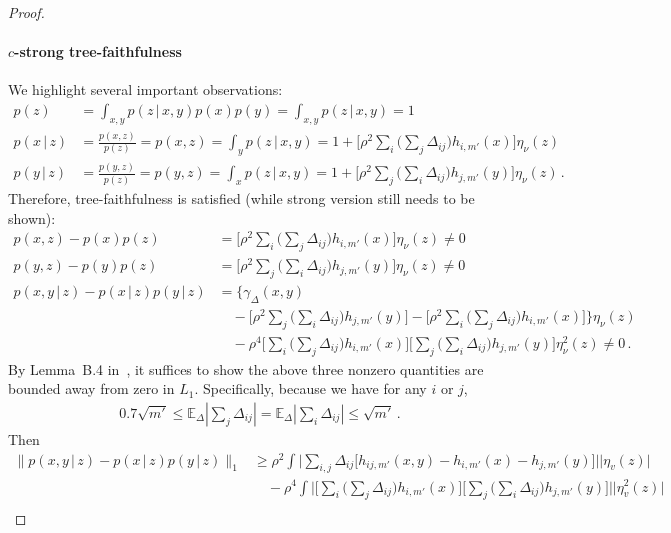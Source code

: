 \documentclass{article}
\theoremstyle{definition}
\theoremstyle{definition}
\theoremstyle{definition}
\theoremstyle{definition}
\theoremstyle{definition}
\theoremstyle{definition}
\theoremstyle{remark}
\theoremstyle{remark}
\newcommand{\E}{\mathbb{E}}
\newcommand{\given}{\,|\,}
\begin{document}
\begin{proof}
    \paragraph{$c$-strong tree-faithfulness}
    We highlight several important observations: 
    \begin{align*}
        p(z) & = \int_{x,y} p(z\given x,y)p(x)p(y) = \int_{x,y} p(z\given x,y) = 1 \\
        p(x\given z) & = \frac{p(x,z)}{p(z)} = p(x,z) = \int_{y} p(z\given x,y) = 1 + \Big[\rho^2\sum_i \Big(\sum_j\Delta_{ij}\Big)h_{i,m'}(x)\Big]\eta_\nu(z) \\
        p(y\given z) & = \frac{p(y,z)}{p(z)} = p(y,z) = \int_{x} p(z\given x,y) = 1 + \Big[\rho^2\sum_j \Big(\sum_i\Delta_{ij}\Big)h_{j,m'}(y)\Big]\eta_\nu(z) \,.
    \end{align*}
    Therefore, tree-faithfulness is satisfied (while strong version still needs to be shown):
    \begin{align*}
        p(x, z) - p(x)p(z) &=  \Big[\rho^2\sum_i \Big(\sum_j\Delta_{ij}\Big)h_{i,m'}(x)\Big]\eta_\nu(z) \ne 0 \\
        p(y, z) - p(y)p(z) &=  \Big[\rho^2\sum_j \Big(\sum_i\Delta_{ij}\Big)h_{j,m'}(y)\Big]\eta_\nu(z) \ne 0 \\
        p(x,y\given z) - p(x\given z) p(y\given z) & = \bigg\{\gamma_{\Delta}(x,y)  \\
        & \quad - \Big[\rho^2\sum_j \Big(\sum_i\Delta_{ij}\Big)h_{j,m'}(y)\Big] - \Big[\rho^2\sum_i \Big(\sum_j\Delta_{ij}\Big)h_{i,m'}(x)\Big]\bigg\}\eta_{\nu}(z) \\
        & \quad - \rho^4\Big[ \sum_i \Big(\sum_j\Delta_{ij}\Big)h_{i,m'}(x)\Big]\Big[\sum_j \Big(\sum_i\Delta_{ij}\Big)h_{j,m'}(y)\Big]\eta_{\nu}^2(z) \ne 0 \,.
    \end{align*}
    By Lemma~B.4 in~\citet{neykov2021minimax}, it suffices to show the above three nonzero quantities are bounded away from zero in $L_1$. Specifically, because we have for any $i$ or $j$, 
    \begin{align*}
       0.7\sqrt{m'}\le \E_{\Delta}|\sum_j \Delta_{ij}| = \E_{\Delta}|\sum_i \Delta_{ij}| \le \sqrt{m'}   \,.
    \end{align*}
    Then
    \begin{align*}
        \|p(x,y\given z) - p(x\given z) p(y\given z)\|_1 & \ge \rho^2 \int \Big| \sum_{i,j}\Delta_{ij}\Big[h_{ij,m'}(x,y) - h_{i,m'}(x) - h_{j,m'}(y)\Big] \Big| \Big|\eta_v(z) \Big|\\
        &\quad - \rho^4 \int \Big| \Big[\sum_{i}\Big(\sum_j\Delta_{ij}\Big)h_{i,m'}(x)\Big] \Big[\sum_{j}\Big(\sum_i\Delta_{ij}\Big)h_{j,m'}(y)\Big]  \Big| \Big|  \eta_v^2(z) \Big| \\

\end{align*}
\end{proof}
\end{document}
